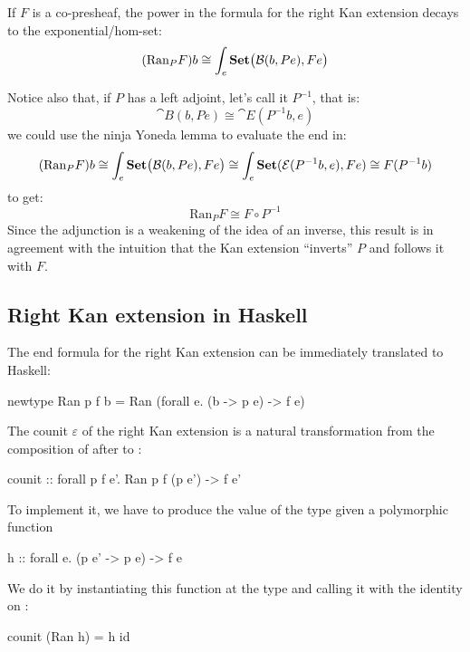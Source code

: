 \documentclass[DaoFP]{subfiles}
\begin{document}
If $F$ is a co-presheaf, the power in the formula for the right Kan extension decays to the exponential/hom-set:
  \[ (\text{Ran}_P F) b \cong \int_e \mathbf{Set} \big( \mathcal{B} (b, P e), F e\big) \]
 
 Notice also that, if $P$ has a left adjoint, let's call it $P^{-1}$, that is:
 \[ \cat B(b, P e) \cong \cat E(P^{-1} b, e) \]
 we could use the ninja Yoneda lemma to evaluate the end in:
 \[ (\text{Ran}_P F) b \cong \int_e \mathbf{Set} \big( \mathcal{B} (b, P e), F e\big) \cong \int_e \mathbf{Set}(\mathcal{E}(P^{-1} b, e), F e) \cong F(P^{-1} b)\]
to get:
 \[  \text{Ran}_P F \cong F \circ P^{-1} \]
 Since the adjunction is a weakening of the idea of an inverse, this result is in agreement with the intuition that the Kan extension ``inverts'' $P$ and follows it with $F$.
 
 \subsection{Right Kan extension in Haskell}
The end formula for the right Kan extension can be immediately translated to Haskell:
 \begin{haskell}
newtype Ran p f b = Ran (forall e. (b -> p e) -> f e)
 \end{haskell}
 
 The counit $\varepsilon$ of the right Kan extension is a natural transformation from the composition of  after  to :
 \begin{haskell}
counit :: forall p f e'. Ran p f (p e') -> f e'
\end{haskell}
To implement it, we have to produce the value of the type  given a polymorphic function 
 \begin{haskell}
h :: forall e. (p e' -> p e) -> f e
\end{haskell}
We do it by instantiating this function at the type  and calling it with the identity on :
 \begin{haskell}
counit (Ran h) = h id
\end{haskell}
\end{document}
